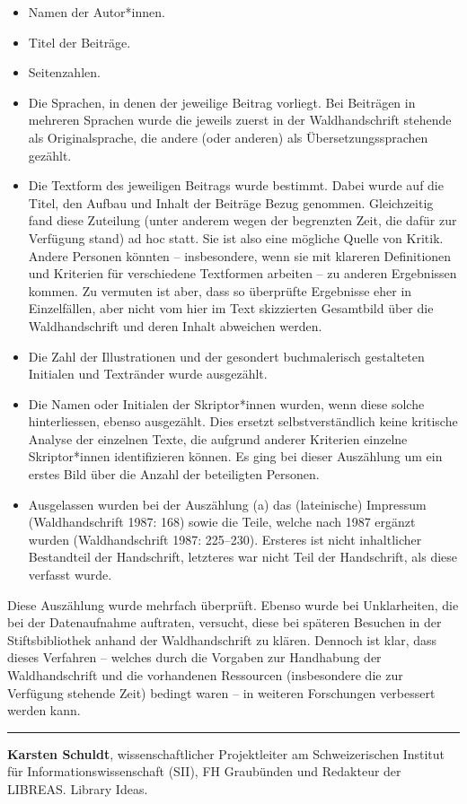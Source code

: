 \documentclass[a4paper,
fontsize=11pt,
oneside,
numbers=noperiodatend,
parskip=half-,
bibliography=totoc,
final
]{scrartcl}
\begin{document}
\begin{itemize}
\item
  Namen der Autor*innen.
\item
  Titel der Beiträge.
\item
  Seitenzahlen.
\item
  Die Sprachen, in denen der jeweilige Beitrag vorliegt. Bei Beiträgen
  in mehreren Sprachen wurde die jeweils zuerst in der Waldhandschrift
  stehende als Originalsprache, die andere (oder anderen) als
  Übersetzungssprachen gezählt.
\item
  Die Textform des jeweiligen Beitrags wurde bestimmt. Dabei wurde auf
  die Titel, den Aufbau und Inhalt der Beiträge Bezug genommen.
  Gleichzeitig fand diese Zuteilung (unter anderem wegen der begrenzten
  Zeit, die dafür zur Verfügung stand) ad hoc statt. Sie ist also eine
  mögliche Quelle von Kritik. Andere Personen könnten -- insbesondere,
  wenn sie mit klareren Definitionen und Kriterien für verschiedene
  Textformen arbeiten -- zu anderen Ergebnissen kommen. Zu vermuten ist
  aber, dass so überprüfte Ergebnisse eher in Einzelfällen, aber nicht
  vom hier im Text skizzierten Gesamtbild über die Waldhandschrift und
  deren Inhalt abweichen werden.
\item
  Die Zahl der Illustrationen und der gesondert buchmalerisch
  gestalteten Initialen und Textränder wurde ausgezählt.
\item
  Die Namen oder Initialen der Skriptor*innen wurden, wenn diese solche
  hinterliessen, ebenso ausgezählt. Dies ersetzt selbstverständlich
  keine kritische Analyse der einzelnen Texte, die aufgrund anderer
  Kriterien einzelne Skriptor*innen identifizieren können. Es ging bei
  dieser Auszählung um ein erstes Bild über die Anzahl der beteiligten
  Personen.
\item
  Ausgelassen wurden bei der Auszählung (a) das (lateinische) Impressum
  (Waldhandschrift 1987: 168) sowie die Teile, welche nach 1987 ergänzt
  wurden (Waldhandschrift 1987: 225--230). Ersteres ist nicht
  inhaltlicher Bestandteil der Handschrift, letzteres war nicht Teil der
  Handschrift, als diese verfasst wurde.
\end{itemize}

Diese Auszählung wurde mehrfach überprüft. Ebenso wurde bei
Unklarheiten, die bei der Datenaufnahme auftraten, versucht, diese bei
späteren Besuchen in der Stiftsbibliothek anhand der Waldhandschrift zu
klären. Dennoch ist klar, dass dieses Verfahren -- welches durch die
Vorgaben zur Handhabung der Waldhandschrift und die vorhandenen
Ressourcen (insbesondere die zur Verfügung stehende Zeit) bedingt waren
-- in weiteren Forschungen verbessert werden kann.

\begin{center}\rule{0.5\linewidth}{0.5pt}\end{center}

\textbf{Karsten Schuldt}, wissenschaftlicher Projektleiter am
Schweizerischen Institut für Informationswissenschaft (SII), FH
Graubünden und Redakteur der LIBREAS. Library Ideas.
\end{document}

